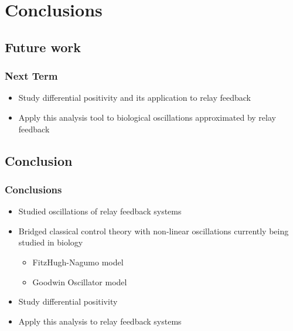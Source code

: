 \documentclass[11pt]{beamer}
\begin{document}
\section{Conclusions}
\subsection{Future work}
\begin{frame}
\frametitle{Next Term}
\begin{itemize}
\item Study differential positivity and its application to relay feedback
\item Apply this analysis tool to biological oscillations approximated by relay feedback 
\end{itemize}
\end{frame}

\subsection{Conclusion}
\begin{frame}
\frametitle{Conclusions}
	\begin{itemize}
	\item Studied oscillations of relay feedback systems
    \item Bridged classical control theory with non-linear oscillations currently being studied in biology
    \begin{itemize}
	\item FitzHugh-Nagumo model 
    \item Goodwin Oscillator model
\end{itemize}
	\item Study differential positivity
	\item Apply this analysis to relay feedback systems
	\end{itemize}
\end{frame}
\end{document}
